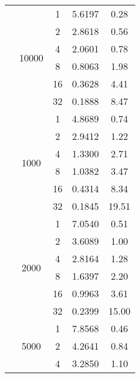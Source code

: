 \begin{tabularx}{\textwidth}{@{} c c c c c @{}}
                            \cmidrule{2-5}
                            & \multirow{6}{*}{10000} & 1  & 5.6197 & 0.28 \\
                            &                        & 2  & 2.8618 & 0.56 \\
                            &                        & 4  & 2.0601 & 0.78 \\
                            &                        & 8  & 0.8063 & 1.98 \\
                            &                        & 16 & 0.3628 & 4.41 \\
                            &                        & 32 & 0.1888 & 8.47 \\
\midrule\enlargethispage{-\baselineskip}
    \multirow{24}{*}{30000} & \multirow{6}{*}{1000} & 1  & 4.8689 & 0.74  \\
                            &                       & 2  & 2.9412 & 1.22  \\
                            &                       & 4  & 1.3300 & 2.71  \\
                            &                       & 8  & 1.0382 & 3.47  \\
                            &                       & 16 & 0.4314 & 8.34  \\
                            &                       & 32 & 0.1845 & 19.51 \\
                            \cmidrule{2-5}
                            & \multirow{6}{*}{2000} & 1  & 7.0540 & 0.51  \\
                            &                       & 2  & 3.6089 & 1.00  \\
                            &                       & 4  & 2.8164 & 1.28  \\
                            &                       & 8  & 1.6397 & 2.20  \\
                            &                       & 16 & 0.9963 & 3.61  \\
                            &                       & 32 & 0.2399 & 15.00 \\
                            \cmidrule{2-5}
                            & \multirow{6}{*}{5000} & 1  & 7.8568 & 0.46 \\
                            &                       & 2  & 4.2641 & 0.84 \\
                            &                       & 4  & 3.2850 & 1.10 \\

\end{tabularx}
